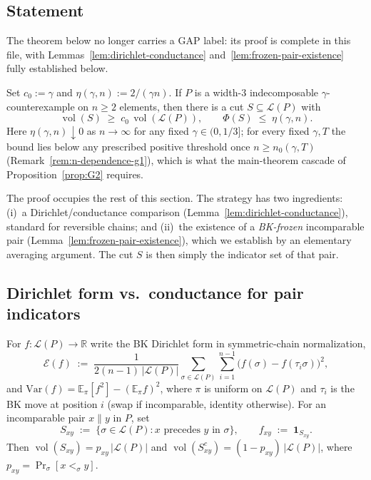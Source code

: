 \subsection{Statement}

The theorem below no longer carries a GAP label: its proof is
complete in this file, with Lemmas~\ref{lem:dirichlet-conductance}
and~\ref{lem:frozen-pair-existence} fully established below.

\begin{theorem}
\label{thm:cex-implies-low-expansion}
Set $c_0 := \gamma$ and $\eta(\gamma, n) := 2/(\gamma n)$. If $P$ is a
width-$3$ indecomposable $\gamma$-counterexample on $n \ge 2$
elements, then there is a cut $S \subseteq \mathcal{L}(P)$ with
\[
  \operatorname{vol}(S)
  \;\ge\; c_0\, \operatorname{vol}(\mathcal L(P)),
  \qquad
  \Phi(S) \;\le\; \eta(\gamma, n).
\]
Here $\eta(\gamma, n) \downarrow 0$ as $n \to \infty$ for any fixed
$\gamma \in (0, 1/3]$; for every fixed $\gamma, T$ the bound lies
below any prescribed positive threshold once
$n \ge n_0(\gamma, T)$ (Remark~\ref{rem:n-dependence-g1}), which is
what the main-theorem cascade of Proposition~\ref{prop:G2} requires.
\end{theorem}

The proof occupies the rest of this section. The strategy has two
ingredients: (i)~a Dirichlet/conductance comparison
(Lemma~\ref{lem:dirichlet-conductance}), standard for reversible
chains; and (ii)~the existence of a \emph{BK-frozen} incomparable
pair (Lemma~\ref{lem:frozen-pair-existence}), which we establish by
an elementary averaging argument. The cut $S$ is then simply the
indicator set of that pair.

\subsection{Dirichlet form vs.\ conductance for pair indicators}

For $f\colon \mathcal{L}(P) \to \mathbb{R}$ write the BK Dirichlet
form in symmetric-chain normalization,
\[
  \mathcal{E}(f)
  \;:=\; \frac{1}{2(n-1)\,|\mathcal L(P)|}
  \sum_{\sigma \in \mathcal L(P)}\sum_{i=1}^{n-1}
  \bigl(f(\sigma) - f(\tau_i \sigma)\bigr)^2,
\]
and $\mathrm{Var}(f) = \mathbb E_\pi[f^2] - (\mathbb E_\pi f)^2$, where
$\pi$ is uniform on $\mathcal L(P)$ and $\tau_i$ is the BK move at
position $i$ (swap if incomparable, identity otherwise). For an
incomparable pair $x \parallel y$ in $P$, set
\[
  S_{xy} \;:=\; \{\sigma \in \mathcal L(P) : x \text{ precedes } y \text{ in } \sigma\},
  \qquad
  f_{xy} \;:=\; \mathbf 1_{S_{xy}}.
\]
Then $\operatorname{vol}(S_{xy}) = p_{xy}\,|\mathcal L(P)|$ and
$\operatorname{vol}(S_{xy}^c) = (1 - p_{xy})\,|\mathcal L(P)|$, where
$p_{xy} = \Pr_{\sigma}[x <_\sigma y]$.

